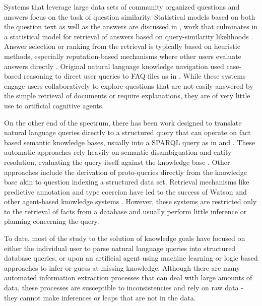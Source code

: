 \documentclass{llncs}
\begin{document}
Systems that leverage large data sets of community organized questions and answers focus on the task of question similarity. Statistical models based on both the question text as well as the answers are discussed in \cite{jeon_finding_2005,jeon_finding_2005-1}, work that culminates in a statistical model for retrieval of answers based on query-similarity likelihoods \cite{xue_retrieval_2008}. Answer selection or ranking from the retrieval is typically based on heuristic methods, especially reputation-based mechanisms where other users evaluate answers directly \cite{wang_wisdom_2013}. Original natural language knowledge navigation used case-based reasoning to direct user queries to FAQ files as in \cite{hammond_faq_1995,burke_question_1997,burke_natural_1997}. While these systems engage users collaboratively to explore questions that are not easily answered by the simple retrieval of documents or require explanations, they are of very little use to artificial cognitive agents.

On the other end of the spectrum, there has been work designed to translate natural language queries directly to a structured query that can operate on fact based semantic knowledge bases, usually into a SPARQL query as in \cite{yahya_natural_2012,unger_template-based_2012} and \cite{berant_semantic_2013}. These automatic approaches rely heavily on semantic disambiguation and entity resolution, evaluating the query itself against the knowledge base \cite{zheng_entity_2012}. Other approaches include the derivation of proto-queries directly from the knowledge base \cite{frank_question_2007} akin to question indexing a structured data set. Retrieval mechanisms like predictive annotation and type coercion have led to the success of Watson and other agent-based knowledge systems \cite{prager_question_2006,kalyanpur_leveraging_2011}. However, these systems are restricted only to the retrieval of facts from a database and usually perform little inference or planning concerning the query.

To date, most of the study to the solution of knowledge goals have focused on either the individual user to parse natural language queries into structured database queries, or upon an artificial agent using machine learning or logic based approaches to infer or guess at missing knowledge. Although there are many automated information extraction processes that can deal with large amounts of data, these processes are susceptible to inconsistencies and rely on raw data - they cannot make inferences or leaps that are not in the data.
\end{document}
